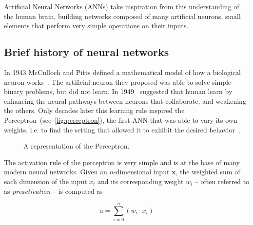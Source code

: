 Artificial Neural Networks (ANNs) take inspiration from this understanding of
the human brain, building networks composed of many artificial neurons, small
elements that perform very simple operations on their inputs.

\subsection{Brief history of neural networks}
In 1943 McCulloch and Pitts defined a mathematical model of how a biological
neuron works~\citep{McCulloch43}. The artificial neuron they proposed was
able to solve simple binary problems, but did not learn. In 1949~\cite{Hebb49}
suggested that human learn by enhancing the neural pathways between neurons
that collaborate, and weakening the others. Only decades later this learning
rule inspired the Perceptron~(see~\autoref{fig:perceptron}), the first ANN that
was able to vary its own weights, i.e. to find the setting that allowed it to
exhibit the desired behavior~\citep{Rosenblatt57}.

\begin{figure}[h]
    \centering
    \begin{neuralnetwork} [nodespacing=6mm, layerspacing=23mm,
            maintitleheight=2.5em, layertitleheight=5em,
            height=3, toprow=true, nodesize=17pt,
            style={}, title={}, titlestyle={}]

        \outputlayer[count=1, text=\nodetextsigma]
        {\setdefaultlinklabel{\wilink}\linklayers}
        \redefinelayerspacing{18mm}
        \outputlayer[count=1, text=\nodetextstep]
        \linklayers
        \redefinelayerspacing{16mm}
        \outputlayer[count=1, text=\nodetexty]
        \linklayers
    \end{neuralnetwork}
    \centering
    \caption{\label{fig:perceptron}A representation of the Perceptron.}
\end{figure}

The activation rule of the perceptron is very simple and is at the base of
many modern neural networks. Given an $n$-dimensional input $\mathbf{x}$, the
weighted sum of each dimension of the input $x_i$ and its corresponding weight
$w_i$ -- often referred to as \emph{preactivation} -- is computed as

\begin{equation*}
    a = \sum_{i=0}^{n}(w_i \cdot x_i)
\end{equation*}

